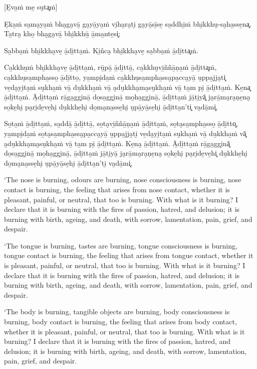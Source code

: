 [E̱va̱ṁ me̱ su̮ta͓ṁ]

E̱ka̱ṁ sa̮ma̮ya̱ṁ bha̮ga̮vā̱ ga̮yā̱ya̱ṁ vi̮ha̮ra̮ti̮ ga̮yā̱sī̱se̱ sa̱ddhi̱ṁ bhi̱kkhu̮-sa̮ha̱sse̱na͓.
Ta̱tra̮ kho̱ bha̮ga̮vā̱ bhi̱kkhū̱ ā̱ma̱nte̱si͓:

Sa̱bba̱ṁ bhi̱kkha̮ve̱ ā̱di̱tta̱ṁ. Ki̱ñca̮ bhi̱kkha̮ve̱ sa̱bba̱ṁ ā̱di̱tta͓ṁ.

Ca̱kkhu̱ṁ bhi̱kkha̮ve̱ ā̱di̱tta̱ṁ, rū̱pā̱ ā̱di̱ttā̱, ca̱kkhu̮vi̱ññā̱ṇa̱ṁ ā̱di̱tta͓ṁ,
ca̱kkhu̮sa̱mpha̱sso̱ ā̱di̱tto̱, ya̱mpi̮da̱ṁ ca̱kkhu̮sa̱mpha̱ssa̮pa̱cca̮yā̱ u̱ppa̱jja̮ti͓
ve̱da̮yi̮ta̱ṁ su̮kha̱ṁ vā̱ du̱kkha̱ṁ vā̱ a̮du̱kkha̮ma̮su̮kha̱ṁ vā̱ ta̱m pi̮ ā̱di̱tta̱ṁ. Ke̱na͓
ā̱di̱tta̱ṁ. Ā̱di̱tta̱ṁ rā̱ga̱ggi̮nā̱ do̱sa̱ggi̮nā̱ mo̱ha̱ggi̮nā̱, ā̱di̱tta̱ṁ jā̱ti̮yā͓
ja̮rā̱ma̮ra̮ṇe̱na̮ so̱ke̱hi̮ pa̮ri̮de̱ve̱hi̮ du̱kkhe̱hi̮ do̱ma̮na̱sse̱hi̮ u̮pā̱yā̱se̱hi̮ ā̱di̱tta̱n'ti͓
va̮dā̱mi͓.

So̱ta̱ṁ ā̱di̱tta̱ṁ, sa̱ddā̱ ā̱di̱ttā̱, so̱ta̮vi̱ññā̱ṇa̱ṁ ā̱di̱tta̱ṁ, so̱ta̮sa̱mpha̱sso̱ ā̱di̱tto͓,
ya̱mpi̮da̱ṁ so̱ta̮sa̱mpha̱ssa̮pa̱cca̮yā̱ u̱ppa̱jja̮ti̮ ve̱da̮yi̮ta̱ṁ su̮kha̱ṁ vā̱ du̱kkha̱ṁ vā͓
a̮du̱kkha̮ma̮su̮kha̱ṁ vā̱ ta̱m pi̮ ā̱di̱tta̱ṁ. Ke̱na̮ ā̱di̱tta̱ṁ. Ā̱di̱tta̱ṁ rā̱ga̱ggi̮nā͓
do̱sa̱ggi̮nā̱ mo̱ha̱ggi̮nā̱, ā̱di̱tta̱ṁ jā̱ti̮yā̱ ja̮rā̱ma̮ra̮ṇe̱na̮ so̱ke̱hi̮ pa̮ri̮de̱ve̱hi͓
du̱kkhe̱hi̮ do̱ma̮na̱sse̱hi̮ u̮pā̱yā̱se̱hi̮ ā̱di̱tta̱n'ti̮ va̮dā̱mi͓.

\clearpage

\englishText
\markboth{\englishTitle}{\rightmark}

‘The nose is burning, odours are burning, nose consciousness is burning,
nose contact is burning, the feeling that arises from nose contact,
whether it is pleasant, painful, or neutral, that too is burning. With
what is it burning? I declare that it is burning with the fires of
passion, hatred, and delusion; it is burning with birth, ageing, and
death, with sorrow, lamentation, pain, grief, and despair.

‘The tongue is burning, tastes are burning, tongue consciousness is
burning, tongue contact is burning, the feeling that arises from tongue
contact, whether it is pleasant, painful, or neutral, that too is
burning. With what is it burning? I declare that it is burning with the
fires of passion, hatred, and delusion; it is burning with birth,
ageing, and death, with sorrow, lamentation, pain, grief, and despair.

‘The body is burning, tangible objects are burning, body consciousness
is burning, body contact is burning, the feeling that arises from body
contact, whether it is pleasant, painful, or neutral, that too is
burning. With what is it burning? I declare that it is burning with the
fires of passion, hatred, and delusion; it is burning with birth,
ageing, and death, with sorrow, lamentation, pain, grief, and despair.

